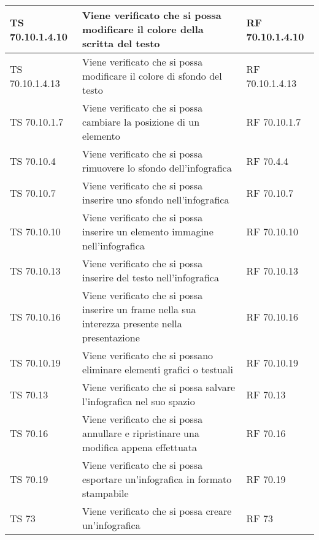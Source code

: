 {{\begin{longtable} [c]{| p{3cm} | p{6cm} |p{3cm}|}
			\hline
			TS 70.10.1.4.10 & Viene verificato che si possa modificare il colore della scritta del testo & RF 70.10.1.4.10\\
			\hline
			TS 70.10.1.4.13 & Viene verificato che si possa modificare il colore di sfondo del testo & RF 70.10.1.4.13\\
			\hline
			TS 70.10.1.7 & Viene verificato che si possa cambiare la posizione di un elemento & RF 70.10.1.7\\
			\hline
			TS 70.10.4 & Viene verificato che si possa rimuovere lo sfondo dell'infografica\ped{g} & RF 70.4.4\\
			\hline
			TS 70.10.7 & Viene verificato che si possa inserire uno sfondo nell'infografica\ped{g} & RF 70.10.7\\
			\hline
			TS 70.10.10 & Viene verificato che si possa inserire un elemento immagine nell'infografica\ped{g} & RF 70.10.10\\
			\hline
			TS 70.10.13 & Viene verificato che si possa inserire del testo nell'infografica\ped{g} & RF 70.10.13\\
			\hline
			TS 70.10.16 & Viene verificato che si possa inserire un frame\ped{g} nella sua interezza presente nella presentazione & RF 70.10.16\\
			\hline
			TS 70.10.19 & Viene verificato che si possano eliminare elementi grafici o testuali & RF 70.10.19\\
			\hline
			TS 70.13 & Viene verificato che si possa salvare l'infografica\ped{g} nel suo spazio & RF 70.13\\
			\hline
			TS 70.16 & Viene verificato che si possa annullare e ripristinare una modifica appena effettuata & RF 70.16\\
			\hline
			TS 70.19 & Viene verificato che si possa esportare un'infografica\ped{g} in formato stampabile & RF 70.19\\
			\hline
			TS 73 & Viene verificato che si possa creare un'infografica\ped{g} & RF 73\\
			\hline
\end{longtable}

}}
